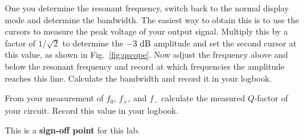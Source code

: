 \begin{measurement} One you determine the resonant frequency, switch back to the normal
display mode and determine the bandwidth.  The easiest way to obtain
this is to use the cursors to measure the peak voltage of your output
signal.  Multiply this by a factor of $1/\sqrt{2}$ to determine
the $-3~\rm dB$ amplitude and set the second cursor at this value, as
shown in Fig.~\ref{fig:qscope}.  Now adjust the frequency above and
below the resonant frequency and record at which frequencies the
amplitude reaches this line. Calculate the bandwidth and record it in your logbook.
\end{measurement}

\begin{measurement} From your measurement of $f_0$, $f_+$, and $f_-$ calculate the
measured $Q$-factor of your circuit. Record this value in your logbook. 
\end{measurement}


\noindent
This is a \textbf{sign-off point} for this lab. 

